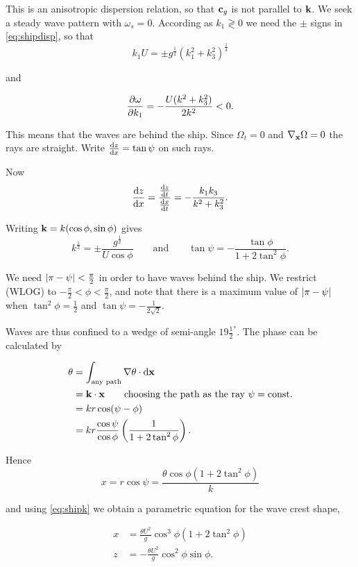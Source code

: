 \documentclass{notes}
\newcommand{\vk}{\vect{k}}
\begin{document}
This is an anisotropic dispersion relation, so that $\mathbf{c}_g$ is not
parallel to $\vk$.  We seek a steady wave pattern with $\omega_s = 0$.
According as $k_1 \gtrless 0$ we need the $\pm$ signs in
\eqref{eq:shipdisp}, so that
\[
k_1 U = \pm g^{\frac{1}{2}} \left( k_1^2 + k_3^2 \right)^{\frac{1}{4}}
\]

and

\[
\frac{\partial \omega}{\partial k_1} = - \frac{U (k^2 + k_3^2)}{2 k^2} < 0.
\]

This means that the waves are behind the ship.  Since $\Omega_t = 0$
and $\nabla_{\mathbf{x}} \Omega = 0$ the rays are straight.  Write
$\frac{\mathrm{d} z}{\mathrm{d} x} = \tan \psi$ on such rays.

Now
\[
\frac{\mathrm{d} z}{\mathrm{d} x} = \frac{\frac{\mathrm{d} z}{\mathrm{d} t}}{\frac{\mathrm{d} x}{\mathrm{d} t}} = - \frac{k_1 k_3}{k^2 + k_3^2}.
\]

Writing $\vk = k(\cos \phi, \sin \phi)$ gives
\begin{equation}\label{eq:shipk}
k^{\frac{1}{2}} = \pm \frac{g^{\frac{1}{2}}}{U \cos \phi} \qquad
\text{and} \qquad
\tan \psi = - \frac{\tan \phi}{1 + 2 \tan^2 \phi}.
\end{equation}

We need $\left|\pi - \psi\right| < \tfrac{\pi}{2}$ in order to have waves
behind the ship.  We restrict (WLOG) to $-\tfrac{\pi}{2} < \phi <
\tfrac{\pi}{2}$, and note that there is a maximum value of $\left|\pi -
  \psi\right|$ when $\tan^2 \phi = \tfrac{1}{2}$ and $\tan \psi = -
\frac{1}{2 \sqrt{2}}$.

Waves are thus confined to a wedge of semi-angle $19
\tfrac{1}{2}^\circ$.  The phase can be calculated by

\begin{align*}
\theta &= \int_{\text{any path}} \nabla \theta \cdot \vect{\ud x} \\
&= \vk \cdot \vx \qquad \text{choosing the path as the ray $\psi =
  \text{const}$.} \\
&= k r \cos (\psi - \phi) \\
&= k r \frac{\cos \psi}{\cos \phi} \left( \frac{1}{1+ 2 \tan^2 \phi} \right).
\end{align*}

Hence
\[
x = r \cos \psi = \frac{ \theta \cos \phi \left( 1+2 \tan^2 \phi \right)}{k}
\]

and using \eqref{eq:shipk} we obtain a parametric equation for the
wave crest shape,

\begin{align*}
x &= \frac{\theta U^2}{g} \cos^3 \phi ( 1+ 2 \tan^2 \phi) \\
z &= - \frac{\theta U^2}{g} \cos^2 \phi \sin \phi.
\end{align*}
\end{document}
